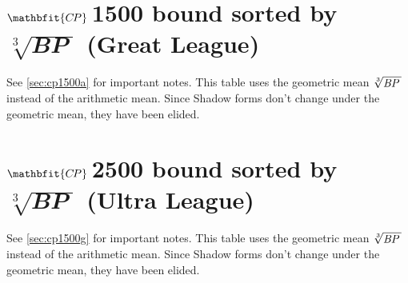 \section[\CP1500 bound sorted by \protect{$\sqrt[3]{\BP\,}$} (Great League)]%
{$\mathbfit{C\kern -1ptP}$\,1500 bound sorted by $\sqrt[3]{\mathbfit{BP}\;}$ (Great League)\label{sec:cp1500g}}
See \autoref{sec:cp1500a} for important notes.
This table uses the geometric mean $\sqrt[3]{\BP\,}$ instead of the arithmetic mean.
Since Shadow forms don't change under the geometric mean, they have been elided.

\section[\CP2500 bound sorted by \protect{$\sqrt[3]{\BP\,}$} (Ultra League)]%
{$\mathbfit{C\kern -1ptP}$\,2500 bound sorted by $\sqrt[3]{\mathbfit{BP}\;}$ (Ultra League)\label{sec:cp2500g}}
See \autoref{sec:cp1500g} for important notes.
This table uses the geometric mean $\sqrt[3]{\mbox{$\mathit{BP}$}{}\,}$ instead of the arithmetic mean.
Since Shadow forms don't change under the geometric mean, they have been elided.

